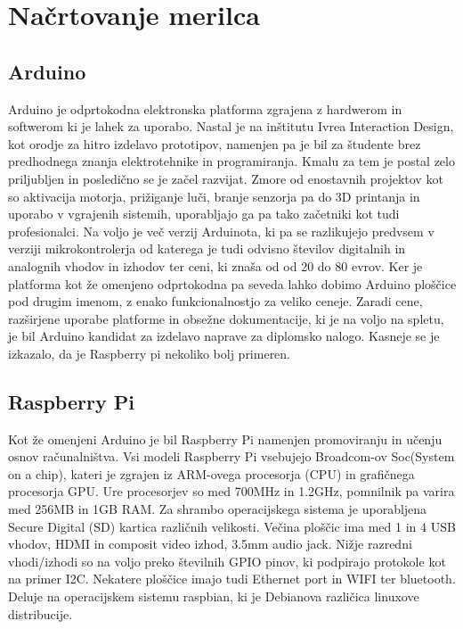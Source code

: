 \documentclass[12pt,a4paper,titlepage,openany]{report}
\begin{document}
\section{Načrtovanje merilca}
\thispagestyle{fancy}


\subsection{Arduino}
Arduino je odprtokodna elektronska platforma zgrajena z hardwerom in softwerom ki je lahek za uporabo. Nastal je na inštitutu Ivrea Interaction Design, kot orodje za hitro izdelavo prototipov, namenjen pa je bil za študente brez predhodnega znanja elektrotehnike in programiranja. Kmalu za tem je postal zelo priljubljen in posledično se je začel razvijat. Zmore od enostavnih projektov kot so aktivacija motorja, prižiganje luči, branje senzorja pa do 3D printanja in uporabo v vgrajenih sistemih, uporabljajo ga pa tako začetniki kot tudi profesionalci. Na voljo je več verzij Arduinota, ki pa se razlikujejo predvsem v verziji mikrokontrolerja od katerega je tudi odvisno številov digitalnih in analognih vhodov in izhodov ter ceni, ki znaša od od 20 do 80 evrov. Ker je platforma kot že omenjeno odprtokodna pa seveda lahko dobimo Arduino ploščice pod drugim imenom, z enako funkcionalnostjo za veliko ceneje. Zaradi cene, razširjene uporabe platforme in obsežne dokumentacije, ki je na voljo na spletu, je bil Arduino kandidat za izdelavo naprave za diplomsko nalogo. Kasneje se je izkazalo, da je Raspberry pi nekoliko bolj     primeren.

\subsection{Raspberry Pi}
Kot že omenjeni Arduino je bil Raspberry Pi namenjen promoviranju in učenju osnov računalništva. Vsi modeli Raspberry Pi vsebujejo Broadcom-ov Soc(System on a chip), kateri je zgrajen iz ARM-ovega procesorja (CPU) in grafičnega procesorja GPU. Ure procesorjev so med 700MHz in 1.2GHz, pomnilnik pa varira med 256MB in 1GB RAM. Za shrambo operacijskega sistema je uporabljena Secure Digital (SD) kartica različnih velikosti. Večina ploščic ima med 1 in 4 USB vhodov, HDMI in composit video izhod, 3.5mm audio jack. Nižje razredni vhodi/izhodi so na voljo preko številnih GPIO pinov, ki podpirajo protokole kot na primer I2C. Nekatere ploščice imajo tudi Ethernet port in WIFI ter bluetooth. Deluje na operacijskem sistemu raspbian, ki je Debianova različica linuxove distribucije.
\end{document}
